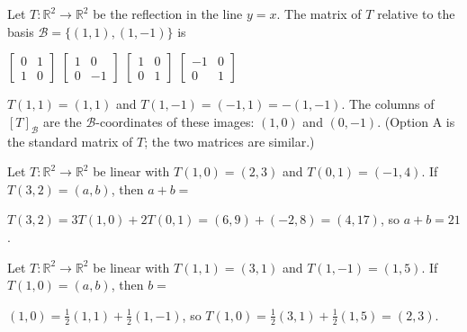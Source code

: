 \begin{question}[id=lt-9, marks=2]
Let $T : \mathbb{R}^2 \to \mathbb{R}^2$ be the reflection in the line $y = x$. The matrix of $T$ relative to the basis $\mathcal{B} = \{(1, 1), (1, -1)\}$ is
\begin{options}
  \option $\begin{bmatrix} 0 & 1 \\ 1 & 0 \end{bmatrix}$
  \correct $\begin{bmatrix} 1 & 0 \\ 0 & -1 \end{bmatrix}$
  \option $\begin{bmatrix} 1 & 0 \\ 0 & 1 \end{bmatrix}$
  \option $\begin{bmatrix} -1 & 0 \\ 0 & 1 \end{bmatrix}$
\end{options}
\begin{solution}
$T(1, 1) = (1, 1)$ and $T(1, -1) = (-1, 1) = -(1, -1)$. The columns of $[T]_{\mathcal{B}}$ are the $\mathcal{B}$-coordinates of these images: $(1, 0)$ and $(0, -1)$. (Option A is the standard matrix of $T$; the two matrices are similar.)
\end{solution}
\end{question}

\begin{question}[id=lt-10]
Let $T : \mathbb{R}^2 \to \mathbb{R}^2$ be linear with $T(1, 0) = (2, 3)$ and $T(0, 1) = (-1, 4)$. If $T(3, 2) = (a, b)$, then $a + b =$
\begin{solution}
$T(3, 2) = 3T(1, 0) + 2T(0, 1) = (6, 9) + (-2, 8) = (4, 17)$, so $a + b = 21$.
\end{solution}
\end{question}

\begin{question}[id=lt-11, marks=2]
Let $T : \mathbb{R}^2 \to \mathbb{R}^2$ be linear with $T(1, 1) = (3, 1)$ and $T(1, -1) = (1, 5)$. If $T(1, 0) = (a, b)$, then $b =$
\begin{solution}
$(1, 0) = \frac{1}{2}(1, 1) + \frac{1}{2}(1, -1)$, so $T(1, 0) = \frac{1}{2}(3, 1) + \frac{1}{2}(1, 5) = (2, 3)$.
\end{solution}
\end{question}

